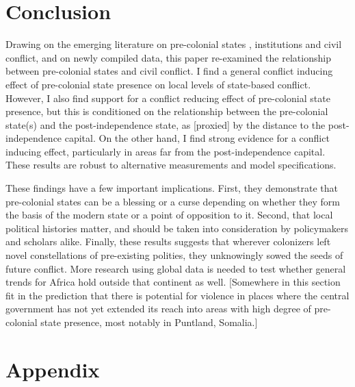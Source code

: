 \documentclass[12pt]{article}
\begin{document}
\section{Conclusion} \label{Conclusion}

Drawing on the emerging literature on pre-colonial states \citep{Paine2019,
Depetris-Chauvin2016}, institutions \citep{Wig2016, Englebert2002,
Michalopoulos2018} and civil conflict, and on newly compiled data, this paper
re-examined the relationship between pre-colonial states and civil conflict. I
find a general conflict inducing effect of pre-colonial state presence on local
levels of state-based conflict. However, I also find support for a conflict
reducing effect of pre-colonial state presence, but this is conditioned on the
relationship between the pre-colonial state(s) and the post-independence state,
as [proxied] by the distance to the post-independence capital. On the other
hand, I find strong evidence for a conflict inducing effect, particularly in
areas far from the post-independence capital. These results are robust to
alternative measurements and model specifications.

These findings have a few important implications. First, they demonstrate that
pre-colonial states can be a blessing or a curse depending on whether they form
the basis of the modern state or a point of opposition to it. Second, that local
political histories matter, and should be taken into consideration by
policymakers and scholars alike. Finally, these results suggests that wherever
colonizers left novel constellations of pre-existing polities, they unknowingly
sowed the seeds of future conflict. More research using global data is needed to
test whether general trends for Africa hold outside that continent as well.
[Somewhere in this section fit in the prediction that there is potential for
violence in places where the central government has not yet extended its reach
into areas with high degree of pre-colonial state presence, most notably in
Puntland, Somalia.]


\pagebreak




\pagebreak
\section*{Appendix}








\end{document}
